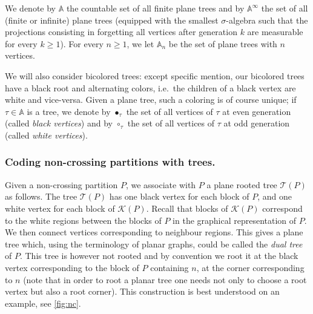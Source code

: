 \documentclass[AHL,XML,longabstracts,Unicode]{cedram}
\def\TTT{\mathcal T}
\begin{document}
We denote by $\mathbb{A}$ the countable set of all finite plane trees and by $\mathbb{A}^{\infty}$   the  set of all (finite or infinite) plane trees
(equipped with the smallest $\sigma$-algebra such that
the projections consisting in forgetting all vertices after generation $k$
are measurable for every $k \geq 1$).
For every  $n \geq 1$, we let $\mathbb{A}_n$
be the set of plane trees with $n$ vertices.

We will also consider bicolored trees:
except specific mention, our bicolored trees have a black root and alternating colors,
i.e.\ the children of a black vertex are white and vice-versa.
Given a plane tree, such a coloring is of course unique;
if $\tau \in \mathbb{A}$ is a tree, we denote by $\bullet_{\tau}$ the set of all vertices of $\tau$ at even generation (called \emph{black vertices}) and by $\circ_{\tau}$ the set of all vertices of $\tau$ at odd generation (called \emph{white vertices}).



\subsubsection{Coding non-crossing partitions with trees.}
\label{sec:coding}
Given a non-crossing partition $P$, we associate with $P$ a plane rooted tree $\TTT(P)$ as follows.
The tree $\TTT(P)$ has one black vertex for each block of $P$, and one white vertex for each block of $\mathcal K(P)$.
Recall that blocks of $\mathcal K(P)$ correspond to the white regions between the blocks of $P$
in the graphical representation of $P$.
We then connect vertices corresponding to neighbour regions.
This gives a plane tree which, using the terminology of planar graphs,
could be called the {\em dual tree} of $P$.
This tree is however not rooted and by convention we  root it at the black vertex
corresponding to the block of $P$ containing $n$, at the corner corresponding to $n$
(note that in order to root a planar tree  one needs not only to choose a root vertex but also a root corner).
This construction is best understood on an example, see \cref{fig:nc}.
\end{document}
